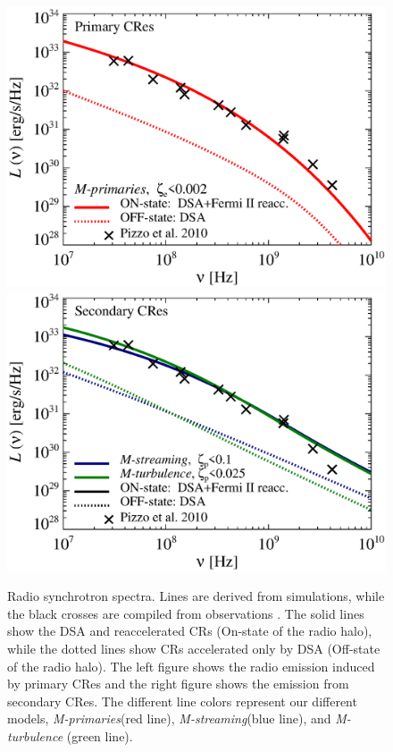 \documentclass[useAMS,usenatbib]{mn2e}
\newcommand{\Mstream}{{\it M-streaming}\xspace}
\newcommand{\Mflatturb}{{\it M-turbulence}\xspace}
\newcommand{\Mprimary}{{\it M-primaries}\xspace}
\begin{document}
\begin{figure}
  \includegraphics[width=1.0\columnwidth]{figures/sync.spec.pri.g72a.140.v5.halo.test5.eps}
  \includegraphics[width=1.0\columnwidth]{figures/sync.spec.sec.g72a.140.v5.halo.test5.eps}
  \caption{Radio synchrotron spectra. Lines are derived from
    simulations, while the black crosses are compiled from
    observations \citet{2010PhDT.......259P}. The solid lines show the
    DSA and reaccelerated CRs (On-state of the radio halo), while the
    dotted lines show CRs accelerated only by DSA (Off-state of the
    radio halo). The left figure shows the radio emission induced by
    primary CRes and the right figure shows the emission from
    secondary CRes. The different line colors represent our different
    models, \Mprimary (red line), \Mstream (blue line), and \Mflatturb
    (green line).}
  \label{fig:sync_spectrum}
\end{figure}
\end{document}
